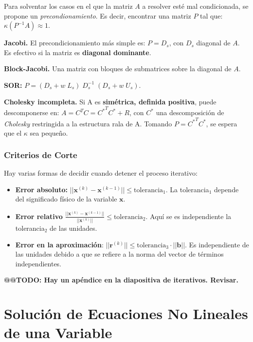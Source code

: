 \documentclass[10pt,a4paper]{article}
\begin{document}
Para solventar los casos en el que la matriz $A$ a resolver esté mal condicionada, se propone un \textit{precondionamiento}. Es decir, encontrar una matriz $P$ tal que: $\kappa (P^{-1}A)\approx 1$.

\begin{description}
\item \textbf{Jacobi.} El precondicionamiento más simple es: $P = D_s$, con $D_s$ diagonal de $A$. Es efectivo si la matriz es \textbf{diagonal dominante}.
\item \textbf{Block-Jacobi.} Una matriz con bloques de submatrices sobre la diagonal de $A$.
\item \textbf{SOR:} $P= (D_s + w \; L_s) \; D_s^{-1} \; (D_s + w \; U_s)$.
\item \textbf{Cholesky incompleta.} Si A es \textbf{simétrica, definida positiva}, puede descomponerse en: $A = C^T C = {C^*}^T C^* + R$, con $C^*$ una descomposición de \textit{Cholesky} restringida a la estructura rala de A. 
Tomando $P = {C^*}^T C^*$, se espera que el $\kappa$ sea pequeño.
\end{description}

\subsubsection{Criterios de Corte}
Hay varias formas de decidir cuando detener el proceso iterativo:
\begin{itemize}
\item \textbf{Error absoluto:} $||\mathbf{x}^{(k)}-\mathbf{x}^{(k-1)}||\leq \text{tolerancia}_1$. La tolerancia$_1$ depende del significado físico de la variable $\mathbf{x}$.
\item \textbf{Error relativo} $\frac{||\mathbf{x}^{(k)}-\mathbf{x}^{(k-1)}||}{||\mathbf{x}^{(k)}||} \leq \text{tolerancia}_2$. Aquí se es independiente la tolerancia$_2$ de las unidades.
\item \textbf{Error en la aproximación}: $||\mathbf{r}^{(k)}||\leq \text{tolerancia}_3 \cdot ||\mathbf{b}||.$ Es independiente de las unidades debido a que se refiere a la norma del vector de términos independientes.
\end{itemize}

\textbf{@@TODO: Hay un apéndice en la diapositiva de iterativos. Revisar.}

\section{Solución de Ecuaciones No Lineales de una Variable}
\end{document}

